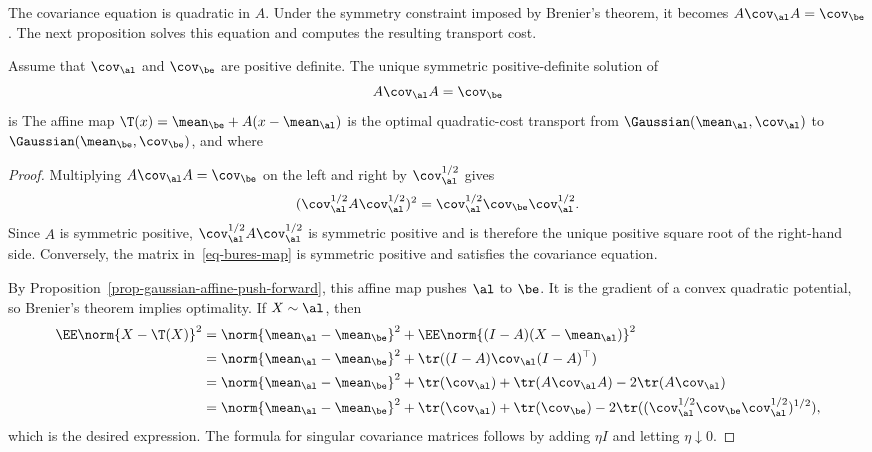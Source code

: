 The covariance equation is quadratic in $A$. Under the symmetry constraint imposed by Brenier's theorem, it becomes $A\cov_\al A=\cov_\be$. The next proposition solves this equation and computes the resulting transport cost.

\begin{prop}\label{prop-gaussian-w2-bures}
	Assume that $\cov_\al$ and $\cov_\be$ are positive definite. The unique symmetric positive-definite solution of
	\[
		A\cov_\al A=\cov_\be
	\]
	is
	The affine map $\T(x)=\mean_\be+A(x-\mean_\al)$ is the optimal quadratic-cost transport from $\Gaussian(\mean_\al,\cov_\al)$ to $\Gaussian(\mean_\be,\cov_\be)$, and
	where
\end{prop}
\begin{proof}
	Multiplying $A\cov_\al A=\cov_\be$ on the left and right by $\cov_\al^{1/2}$ gives
	\[
		(\cov_\al^{1/2}A\cov_\al^{1/2})^2
		=
		\cov_\al^{1/2}\cov_\be\cov_\al^{1/2}.
	\]
	Since $A$ is symmetric positive, $\cov_\al^{1/2}A\cov_\al^{1/2}$ is symmetric positive and is therefore the unique positive square root of the right-hand side. Conversely, the matrix in~\eqref{eq-bures-map} is symmetric positive and satisfies the covariance equation.

	By Proposition~\ref{prop-gaussian-affine-push-forward}, this affine map pushes $\al$ to $\be$. It is the gradient of a convex quadratic potential, so Brenier's theorem implies optimality. If $X\sim\al$, then
	\begin{align*}
		\EE\norm{X-\T(X)}^2
		&=
		\norm{\mean_\al-\mean_\be}^2
		+
		\EE\norm{(I-A)(X-\mean_\al)}^2 \\
		&=
		\norm{\mean_\al-\mean_\be}^2
		+
		\tr((I-A)\cov_\al(I-A)^\top) \\
		&=
		\norm{\mean_\al-\mean_\be}^2
		+
		\tr(\cov_\al)+\tr(A\cov_\al A)-2\tr(A\cov_\al) \\
		&=
		\norm{\mean_\al-\mean_\be}^2
		+
		\tr(\cov_\al)+\tr(\cov_\be)
		-2\tr((\cov_\al^{1/2}\cov_\be\cov_\al^{1/2})^{1/2}),
	\end{align*}
	which is the desired expression. The formula for singular covariance matrices follows by adding $\eta I$ and letting $\eta\downarrow0$.
\end{proof}

